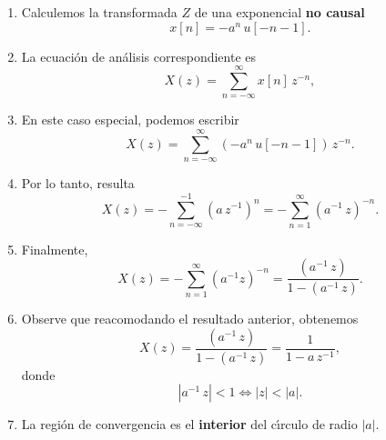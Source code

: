 \begin{enumerate}

\item Calculemos la transformada $Z$ de una exponencial \textbf{no causal}
\begin{equation}
x\left[ n\right] =-a^{n} \, u\left[ -n-1\right] .
\end{equation}

\item La ecuaci\'{o}n de an\'{a}lisis correspondiente es
\begin{equation}
X\left( z\right) =\sum_{n=-\infty }^{\infty }x\left[ n\right] \, z^{-n},
\end{equation}

\item En este caso especial, podemos escribir
\begin{equation}
X\left( z\right) = \sum_{n=-\infty }^{\infty }\left( -a^{n} \, u\left[ -n-1\right] \right) \, z^{-n}.
\end{equation}

\item Por lo tanto, resulta
\begin{equation}
X\left( z\right) =-\sum_{n=-\infty }^{-1}\left( a \, z^{-1}\right)^{n}=
  -\sum_{n=1}^{\infty }\left( a^{-1} \, z\right) ^{-n}.
\end{equation}

\item Finalmente, 
\begin{equation}
X\left( z\right) =-\sum_{n=1}^{\infty }\left( a^{-1}z\right) ^{-n}=
  \frac{\left( a^{-1} \, z\right) }{1-\left( a^{-1} \, z\right) }.
\end{equation}

\item Observe que reacomodando el resultado anterior, obtenemos
\begin{equation}
X\left( z\right) =\frac{\left( a^{-1} \, z\right) }{1-\left( a^{-1} \, z\right) }=\frac{1}{1-a \, z^{-1}},
\end{equation}
donde
\begin{equation}
 \left| a^{-1} \, z\right| <1\Leftrightarrow \left|z\right| <\left| a\right| .
\end{equation}

\item La regi\'{o}n de convergencia es el \textbf{interior} del c\'{\i}rculo de radio $\left| a\right|$.

\end{enumerate}

